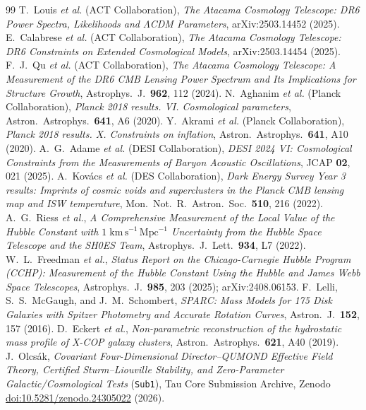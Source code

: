 \documentclass[11pt,a4paper]{article}
\begin{document}
\begin{thebibliography}{99}
 T.~Louis \textit{et al.} (ACT Collaboration), \textit{The Atacama Cosmology Telescope: DR6 Power Spectra, Likelihoods and $\Lambda$CDM Parameters}, arXiv:2503.14452 (2025).
 E.~Calabrese \textit{et al.} (ACT Collaboration), \textit{The Atacama Cosmology Telescope: DR6 Constraints on Extended Cosmological Models}, arXiv:2503.14454 (2025).
 F.~J.~Qu \textit{et al.} (ACT Collaboration), \textit{The Atacama Cosmology Telescope: A Measurement of the DR6 CMB Lensing Power Spectrum and Its Implications for Structure Growth}, Astrophys.\ J.\ \textbf{962}, 112 (2024).
 N.~Aghanim \textit{et al.} (Planck Collaboration), \textit{Planck 2018 results. VI. Cosmological parameters}, Astron.\ Astrophys.\ \textbf{641}, A6 (2020).
 Y.~Akrami \textit{et al.} (Planck Collaboration), \textit{Planck 2018 results. X. Constraints on inflation}, Astron.\ Astrophys.\ \textbf{641}, A10 (2020).
 A.~G.~Adame \textit{et al.} (DESI Collaboration), \textit{DESI 2024 VI: Cosmological Constraints from the Measurements of Baryon Acoustic Oscillations}, JCAP \textbf{02}, 021 (2025).
 A.~Kov\'acs \textit{et al.} (DES Collaboration), \textit{Dark Energy Survey Year 3 results: Imprints of cosmic voids and superclusters in the Planck CMB lensing map and ISW temperature}, Mon.\ Not.\ R.\ Astron.\ Soc.\ \textbf{510}, 216 (2022).
 A.~G.~Riess \textit{et al.}, \textit{A Comprehensive Measurement of the Local Value of the Hubble Constant with $1\;\mathrm{km\,s^{-1}\,Mpc^{-1}}$ Uncertainty from the Hubble Space Telescope and the SH0ES Team}, Astrophys.\ J.\ Lett.\ \textbf{934}, L7 (2022).
 W.~L.~Freedman \textit{et al.}, \textit{Status Report on the Chicago-Carnegie Hubble Program (CCHP): Measurement of the Hubble Constant Using the Hubble and James Webb Space Telescopes}, Astrophys.\ J.\ \textbf{985}, 203 (2025); arXiv:2408.06153.
 F.~Lelli, S.~S.~McGaugh, and J.~M.~Schombert, \textit{SPARC: Mass Models for 175 Disk Galaxies with Spitzer Photometry and Accurate Rotation Curves}, Astron.\ J.\ \textbf{152}, 157 (2016).
 D.~Eckert \textit{et al.}, \textit{Non-parametric reconstruction of the hydrostatic mass profile of X-COP galaxy clusters}, Astron.\ Astrophys.\ \textbf{621}, A40 (2019).
 J.~Olcs\'ak, \textit{Covariant Four-Dimensional Director--QUMOND Effective Field Theory, Certified Sturm--Liouville Stability, and Zero-Parameter Galactic/Cosmological Tests} ({\upshape\texttt{Sub1}}), Tau Core Submission Archive, Zenodo \href{https://doi.org/10.5281/zenodo.24305022}{doi:10.5281/zenodo.24305022} (2026).

\end{thebibliography}
\end{document}
